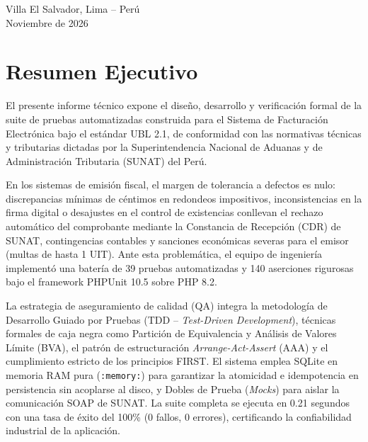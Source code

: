 \documentclass[11pt,a4paper]{article}
\begin{document}
\begin{titlepage}
    \vfill
    
    {\normalsize Villa El Salvador, Lima -- Perú}\\[0.15cm]
    {\small Noviembre de 2026}
\end{titlepage}

\thispagestyle{plain}
\section*{Resumen Ejecutivo}

El presente informe técnico expone el diseño, desarrollo y verificación formal de la suite de pruebas automatizadas construida para el Sistema de Facturación Electrónica bajo el estándar UBL 2.1, de conformidad con las normativas técnicas y tributarias dictadas por la Superintendencia Nacional de Aduanas y de Administración Tributaria (SUNAT) del Perú.

En los sistemas de emisión fiscal, el margen de tolerancia a defectos es nulo: discrepancias mínimas de céntimos en redondeos impositivos, inconsistencias en la firma digital o desajustes en el control de existencias conllevan el rechazo automático del comprobante mediante la Constancia de Recepción (CDR) de SUNAT, contingencias contables y sanciones económicas severas para el emisor (multas de hasta 1 UIT). Ante esta problemática, el equipo de ingeniería implementó una batería de 39 pruebas automatizadas y 140 aserciones rigurosas bajo el framework PHPUnit 10.5 sobre PHP 8.2.

La estrategia de aseguramiento de calidad (QA) integra la metodología de Desarrollo Guiado por Pruebas (TDD -- \textit{Test-Driven Development}), técnicas formales de caja negra como Partición de Equivalencia y Análisis de Valores Límite (BVA), el patrón de estructuración \textit{Arrange-Act-Assert} (AAA) y el cumplimiento estricto de los principios FIRST. El sistema emplea SQLite en memoria RAM pura (\texttt{:memory:}) para garantizar la atomicidad e idempotencia en persistencia sin acoplarse al disco, y Dobles de Prueba (\textit{Mocks}) para aislar la comunicación SOAP de SUNAT. La suite completa se ejecuta en 0.21 segundos con una tasa de éxito del 100\% (0 fallos, 0 errores), certificando la confiabilidad industrial de la aplicación.

\vspace{0.5cm}
\tableofcontents
\newpage
\end{document}
